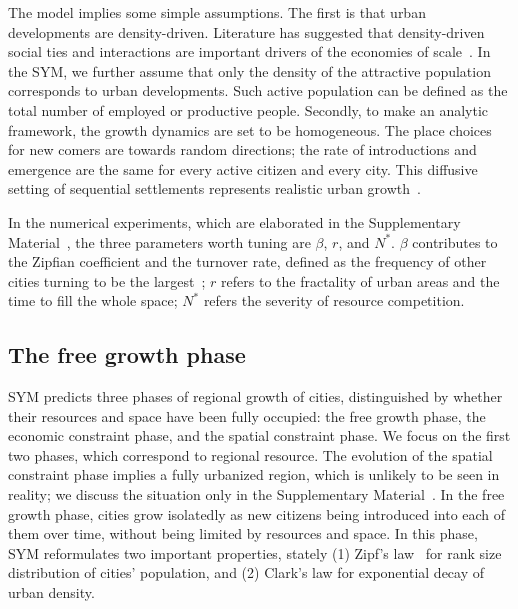 The model implies some simple assumptions. The first is that urban developments are density-driven. Literature has suggested that density-driven social ties and interactions are important drivers of the economies of scale~\cite{pan2013urban, girardin2009quantifying, batty1992form}. In the SYM, we further assume that only the density of the attractive population corresponds to urban developments. Such active population can be defined as the total number of employed or productive people. Secondly, to make an analytic framework, the growth dynamics are set to be homogeneous. The place choices for new comers are towards random directions; the rate of introductions and emergence are the same for every active citizen and every city. This diffusive setting of sequential settlements represents realistic urban growth~\cite{RevModPhys.87.925}. 

In the numerical experiments, which are elaborated in the Supplementary Material~\cite{SuppInfo}, the three parameters worth tuning are $\beta$, $r$, and $N^*$. $\beta$ contributes to the Zipfian coefficient and the turnover rate, defined as the frequency of other cities turning to be the largest~\cite{rooney2006structural}; $r$ refers to the fractality of urban areas and the time to fill the whole space; $N^*$ refers the severity of resource competition. 


\subsection{The free growth phase}

SYM predicts three phases of regional growth of cities, distinguished by whether their resources and space have been fully occupied: the free growth phase, the economic constraint phase, and the spatial constraint phase. We focus on the first two phases, which correspond to regional resource. The evolution of the spatial constraint phase implies a fully urbanized region, which is unlikely to be seen in reality; we discuss the situation only in the Supplementary Material~\cite{SuppInfo}. In the free growth phase, cities grow isolatedly as new citizens being introduced into each of them over time, without being limited by resources and space. In this phase, SYM reformulates two important properties, stately (1) Zipf's law~\cite{gabaix1999zipf's} for rank size distribution of cities' population, and (2) Clark's law for exponential decay of urban density\cite{clark1951urban}. 

